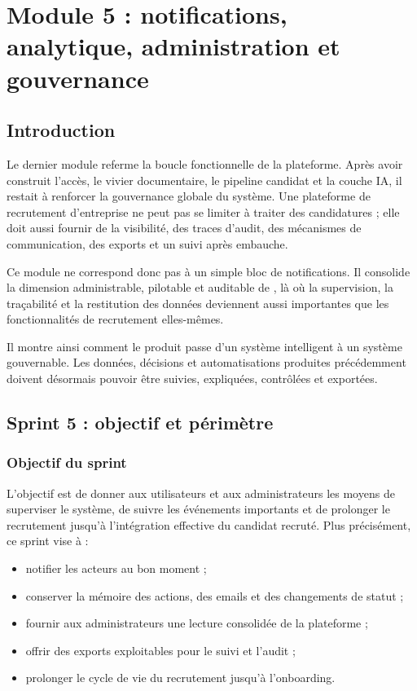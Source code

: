 \chapter{Module 5 : notifications, analytique, administration et gouvernance}

\section*{Introduction}
Le dernier module referme la boucle fonctionnelle de la plateforme. Après avoir construit l'accès, le vivier documentaire, le pipeline candidat et la couche IA, il restait à renforcer la gouvernance globale du système. Une plateforme de recrutement d'entreprise ne peut pas se limiter à traiter des candidatures ; elle doit aussi fournir de la visibilité, des traces d'audit, des mécanismes de communication, des exports et un suivi après embauche.

Ce module ne correspond donc pas à un simple bloc de notifications. Il consolide la dimension administrable, pilotable et auditable de \projectname{}, là où la supervision, la traçabilité et la restitution des données deviennent aussi importantes que les fonctionnalités de recrutement elles-mêmes.

Il montre ainsi comment le produit passe d'un système intelligent à un système gouvernable. Les données, décisions et automatisations produites précédemment doivent désormais pouvoir être suivies, expliquées, contrôlées et exportées.

\section{Sprint 5 : objectif et périmètre}

\subsection{Objectif du sprint}
L'objectif est de donner aux utilisateurs et aux administrateurs les moyens de superviser le système, de suivre les événements importants et de prolonger le recrutement jusqu'à l'intégration effective du candidat recruté. Plus précisément, ce sprint vise à :
\begin{itemize}
  \item notifier les acteurs au bon moment ;
  \item conserver la mémoire des actions, des emails et des changements de statut ;
  \item fournir aux administrateurs une lecture consolidée de la plateforme ;
  \item offrir des exports exploitables pour le suivi et l'audit ;
  \item prolonger le cycle de vie du recrutement jusqu'à l'onboarding.
\end{itemize}

